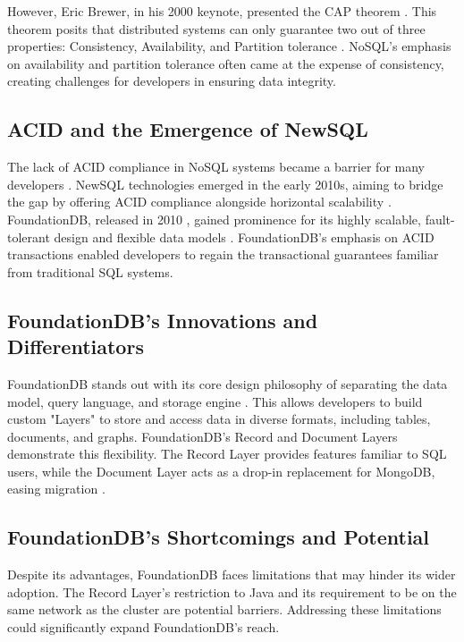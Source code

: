 \documentclass[sigconf]{acmart}
\begin{document}
However, Eric Brewer, in his 2000 keynote, presented the CAP theorem \cite{Brewer,Browne_2009}. This theorem posits that distributed systems can only guarantee two out of three properties: Consistency, Availability, and Partition tolerance \cite{BrewerSupport}. NoSQL's emphasis on availability and partition tolerance often came at the expense of consistency, creating challenges for developers in ensuring data integrity.

\subsection{ACID and the Emergence of NewSQL}

The lack of ACID compliance in NoSQL systems became a barrier for many developers \cite{NewSQL}. NewSQL technologies emerged in the early 2010s, aiming to bridge the gap by offering ACID compliance alongside horizontal scalability \cite{NewSQL}. FoundationDB, released in 2010 \cite{FoundationDBCreation}, gained prominence for its highly scalable, fault-tolerant design and flexible data models \cite{FoundationDBPaper,Snowflake}. FoundationDB's emphasis on ACID transactions enabled developers to regain the transactional guarantees familiar from traditional SQL systems.

\subsection{FoundationDB's Innovations and Differentiators}

FoundationDB stands out with its core design philosophy of separating the data model, query language, and storage engine \cite{FoundationDBPaper}. This allows developers to build custom "Layers" to store and access data in diverse formats, including tables, documents, and graphs. FoundationDB's Record and Document Layers demonstrate this flexibility. The Record Layer provides features familiar to SQL users, while the Document Layer acts as a drop-in replacement for MongoDB, easing migration \cite{FDBDocumentGithub}.

\subsection{FoundationDB's Shortcomings and Potential}

Despite its advantages, FoundationDB faces limitations that may hinder its wider adoption. The Record Layer's restriction to Java and its requirement to be on the same network as the cluster are potential barriers. Addressing these limitations could significantly expand FoundationDB's reach.
\end{document}
